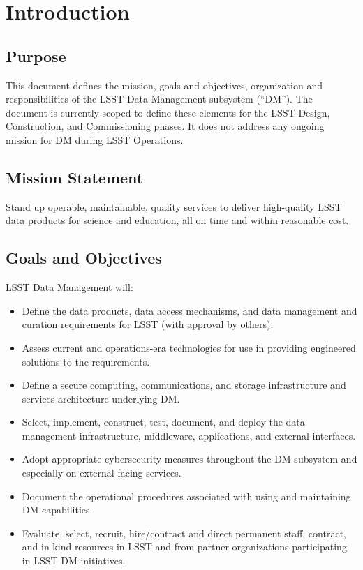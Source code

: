 \section{Introduction}
\subsection{Purpose}
This document defines the mission, goals and objectives, organization and responsibilities of the LSST Data Management subsystem (``DM'').
The document is currently scoped to define these elements for the LSST Design, Construction, and Commissioning phases.
It does not address any ongoing mission for DM during LSST Operations.

\subsection{Mission Statement}
Stand up operable, maintainable, quality services to deliver high-quality LSST data products for science and education, all on time and within reasonable cost.

\subsection{Goals and Objectives}
LSST Data Management will:
\begin{itemize}
\item Define the data products, data access mechanisms, and data management and curation requirements for LSST (with approval by others).
\item Assess current and operations-era technologies for use in providing engineered solutions to the requirements.
\item Define a secure computing, communications, and storage infrastructure and services architecture underlying DM.
\item Select, implement, construct, test, document, and deploy the data management infrastructure, middleware, applications, and external interfaces.
\item Adopt appropriate cybersecurity measures throughout the DM subsystem and especially on external facing services.
\item Document the operational procedures associated with using and maintaining DM capabilities.
\item Evaluate, select, recruit, hire/contract and direct permanent staff, contract, and in-kind resources in LSST and from partner organizations participating in LSST DM initiatives.

\end{itemize}

